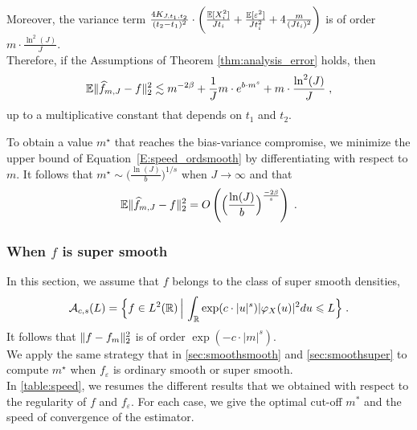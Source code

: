 Moreover, the variance term $\frac{4 K_{J, t_1, t_2}}{(t_2 - t_1)^2} 
	 \cdot \bigg( \frac{\mathbb{E}[X_i^2]}{J t_i} 
			+ \frac{\mathbb{E}[\varepsilon^2]}{J t_i^2} + 4 \frac{m}{(J t_i)^2} \bigg)$ is of order $m \cdot \frac{\ln^2(J)}{J}$.\\
        
		
Therefore, if the Assumptions of Theorem \ref{thm:analysis_error} holds, then 
	\begin{equation}
	\mathbb{E} \lVert\widehat f_{m, J} - f\rVert_2^2  
	\lesssim 
	m^{-2\beta} + \frac{1}{J} m \cdot e^{b\cdot m^s} + m \cdot \frac{\ln^2(J)}{J}
	\; ,
	\label{E:speed_ordsmooth}
	\end{equation}
 up to a multiplicative constant that depends on $t_1$ and $t_2$. 


To obtain a value $m^\star$ that reaches the bias-variance compromise, we minimize the upper bound of Equation~\eqref{E:speed_ordsmooth} by differentiating with respect to $m$. It follows that $m^\star \sim \big( \frac{\ln(J)}{b} \big)^{1/s}$ when $J \to \infty$ and that
	\begin{equation*}
	\mathbb{E} \lVert\widehat f_{m, J} - f\rVert_2^2  
	= O\left( \Big(\frac{\ln(J)}{b}\Big)^{\frac{-2\beta}{s}} \right)
	\; .
	\end{equation*}
	
\subsubsection*{When $f$ is super smooth} 
In this section, we assume that $f$ belongs to the class of super smooth densities, 
	\begin{equation*}
	\mathcal{A}_{c, s}(L) 
	= 
	\Big\{ f \in L^2(\mathbb{R}) \, \Big| \, \int_{\mathbb{R}} \exp(c \cdot|u|^s) |\varphi_X(u)|^2 du \leqslant L \Big\}
	\; .
	\end{equation*}
It follows that $\lVert f - f_m\rVert_2^2 $ is of order $ \exp(-c\cdot|m|^s)$. \\

We apply the same strategy that in \cref{sec:smoothsmooth} and \cref{sec:smoothsuper} to compute $m^\star$ when $f_\varepsilon$ is ordinary smooth or super smooth. \\

In \cref{table:speed}, we resumes the different results that we obtained with respect to the regularity of $f$ and $f_\varepsilon$. For each case, we give the optimal cut-off $m^*$ and the speed of convergence of the estimator. 
 
